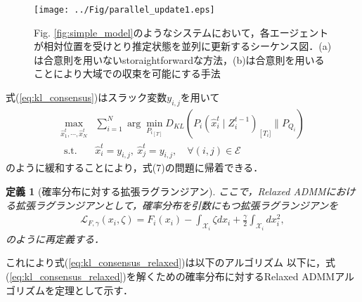 \documentclass[a4paper,10pt]{paper_template}
\newtheorem{definition}{定義}
\begin{document}
\begin{figure}[t]
	\begin{center}
		\texttt{[image: ../Fig/parallel\_update1.eps]}
		\caption{Fig. \ref{fig:simple_model}のようなシステムにおいて，各エージェントが相対位置を受けとり推定状態を並列に更新するシーケンス図．(a)は合意則を用いないstoraightforwardな方法，(b)は合意則を用いることにより大域での収束を可能にする手法}
		\label{fig:parallel_update}
	\end{center}
	\vspace{-2mm}
\end{figure}

式(\ref{eq:kl_consensus})はスラック変数$y_{i,j}$を用いて
\begin{equation}
\begin{aligned}
\max _{\hat x_{1}^{t}, \cdots, \hat x_{N}^{t}} & \sum_{i=1}^{N} \arg \min _{{P_{i}}_{[T]}} D_{K L}\left(P_{i}\left(\hat x_{i}^{t} \mid Z_{i}^{t-1}\right)_{\left[T_{i}]\right.} \| P_{Q_{i}} \right) \\
\text { s.t. } & \hat x_{i}^{t}=y_{i,j}, \:\hat x_{j}^{t}=y_{i,j}, \quad\forall(i, j) \in \mathcal{E}
\label{eq:kl_consensus_relaxed}
\end{aligned}
\end{equation}
のように緩和することにより，式(7)の問題に帰着できる．

\begin{definition}[確率分布に対する拡張ラグランジアン]
ここで，Relaxed ADMMにおける拡張ラグランジアンとして，確率分布を引数にもつ拡張ラグランジアンを
\begin{equation}
\begin{aligned}
 {\mathcal{ L}}_{F,\gamma}(x_i, \zeta) 
 = F_i(x_i) - \int_{{\mathcal{X}}_i}
\zeta dx_i + \frac{\gamma}{2}\int_{{\mathcal{X}}_i} dx_i^2,
\label{eq:relaxed_lagrangian}
\end{aligned}
\end{equation}
のように再定義する．
\end{definition}

これにより式(\ref{eq:kl_consensus_relaxed})は以下のアルゴリズム
以下に，式(\ref{eq:kl_consensus_relaxed})を解くための確率分布に対するRelaxed ADMMアルゴリズムを定理として示す．
\end{document}
